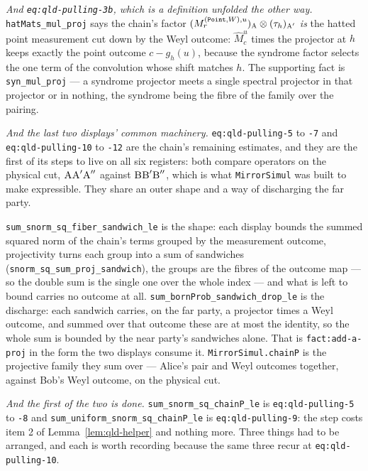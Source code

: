 \emph{And \texttt{eq:qld-pulling-3b}, which is a definition unfolded the other way.}
\texttt{hatMats\_mul\_proj} says the chain's factor $(M^{(\mathtt{Point},W),u}_r)_{\textsc{A}} \otimes
(\tau_h)_{\textsc{A}'}$ \emph{is} the hatted point measurement cut down by the Weyl outcome:
$\widehat{M}^{u}_{c}$ times the projector at $h$ keeps exactly the point outcome $c - g_h(u)$,
because the syndrome factor selects the one term of the convolution whose shift matches $h$. The
supporting fact is \texttt{syn\_mul\_proj} --- a syndrome projector meets a single spectral
projector in that projector or in nothing, the syndrome being the fibre of the family over the
pairing.

\emph{And the last two displays' common machinery.} \texttt{eq:qld-pulling-5} to \texttt{-7} and
\texttt{eq:qld-pulling-10} to \texttt{-12} are the chain's remaining estimates, and they are the
first of its steps to live on all six registers: both compare operators on the physical cut,
$\textsc{A} \textsc{A}' \textsc{A}''$ against $\textsc{B} \textsc{B}' \textsc{B}''$, which is what \texttt{MirrorSimul} was built
to make expressible. They share an outer shape and a way of discharging the far party.

\texttt{sum\_snorm\_sq\_fiber\_sandwich\_le} is the shape: each display bounds the summed squared
norm of the chain's terms grouped by the measurement outcome, projectivity turns each group into a
sum of sandwiches (\texttt{snorm\_sq\_sum\_proj\_sandwich}), the groups are the fibres of the
outcome map --- so the double sum is the single one over the whole index --- and what is left to
bound carries no outcome at all. \texttt{sum\_bornProb\_sandwich\_drop\_le} is the discharge: each
sandwich carries, on the far party, a projector times a Weyl outcome, and summed over that outcome
these are at most the identity, so the whole sum is bounded by the near party's sandwiches alone.
That is \texttt{fact:add-a-proj} in the form the two displays consume it.
\texttt{MirrorSimul.chainP} is the projective family they sum over --- Alice's pair and Weyl
outcomes together, against Bob's Weyl outcome, on the physical cut.

\emph{And the first of the two is done.} \texttt{sum\_snorm\_sq\_chainP\_le} is
\texttt{eq:qld-pulling-5} to \texttt{-8} and
\texttt{sum\_uniform\_snorm\_sq\_chainP\_le} is \texttt{eq:qld-pulling-9}: the step costs item
2 of Lemma~\ref{lem:qld-helper} and nothing more. Three things had to be arranged, and each is
worth recording because the same three recur at \texttt{eq:qld-pulling-10}.

